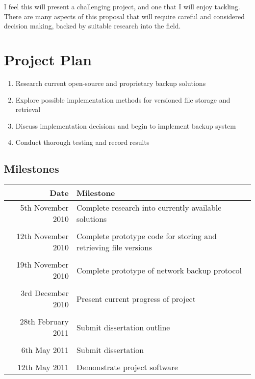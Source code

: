 \documentclass[a4paper]{article}
\begin{document}
    I feel this will present a challenging project, and one that I will enjoy
    tackling. There are many aspects of this proposal that will require careful
    and considered decision making, backed by suitable research into the field.

    \section{Project Plan}

    \begin{enumerate}
        \item Research current open-source and proprietary backup solutions
        \item Explore possible implementation methods for versioned file
            storage and retrieval
        \item Discuss implementation decisions and begin to implement backup
            system
        \item Conduct thorough testing and record results
    \end{enumerate}

    \subsection{Milestones}

    \begin{tabular}{ r | l }
        Date & Milestone \\ \hline

        5th November 2010   & Complete research into currently available
                                solutions \\ \\
        12th November 2010  & Complete prototype code for storing and
                                retrieving file versions \\ \\
        19th November 2010  & Complete prototype of network backup
                                protocol \\ \\
        3rd December 2010   & Present current progress of project \\ \\
        28th February 2011  & Submit dissertation outline \\ \\
        6th May 2011        & Submit dissertation \\ \\
        12th May 2011       & Demonstrate project software \\
    \end{tabular}
\end{document}

